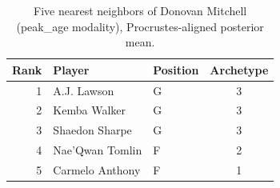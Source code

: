 \begin{table}[htbp]
  \centering\small
  \begin{tabular}{rllc}
    \toprule
    Rank & Player & Position & Archetype \\
    \midrule
    1 & A.J. Lawson & G & 3 \\
    2 & Kemba Walker & G & 3 \\
    3 & Shaedon Sharpe & G & 3 \\
    4 & Nae'Qwan Tomlin & F & 2 \\
    5 & Carmelo Anthony & F & 1 \\
    \bottomrule
  \end{tabular}
  \caption{Five nearest neighbors of Donovan Mitchell (peak_age modality), Procrustes-aligned posterior mean.}
  \label{tab:Donovan_Mitchell_neighbors_peak_age}
\end{table}

